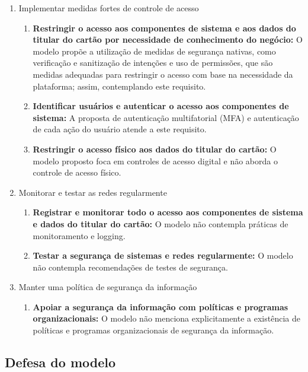\begin{enumerate}
        \item Implementar medidas fortes de controle de acesso
            \begin{enumerate}
            \item \textbf{Restringir o acesso aos componentes de sistema e aos dados do titular do cartão por necessidade de conhecimento do negócio:} O modelo propõe a utilização de medidas de segurança nativas, como verificação e sanitização de intenções e uso de permissões, que são medidas adequadas para restringir o acesso com base na necessidade da plataforma; assim, contemplando este requisito. 
            \item \textbf{Identificar usuários e autenticar o acesso aos componentes de sistema:} A proposta de autenticação multifatorial (MFA) e autenticação de cada ação do usuário atende a este requisito.
            \item \textbf{Restringir o acesso físico aos dados do titular do cartão:} O modelo proposto  foca em controles de acesso digital e não aborda o controle de acesso físico. 
            \end{enumerate}

        \item Monitorar e testar as redes regularmente
            \begin{enumerate}
            \item \textbf{Registrar e monitorar todo o acesso aos componentes de sistema e dados do titular do cartão:} O modelo não contempla práticas de monitoramento e logging.
            \item \textbf{Testar a segurança de sistemas e redes regularmente:} O modelo não contempla recomendações de testes de segurança.
            \end{enumerate}

        \item Manter uma política de segurança da informação
            \begin{enumerate}
            \item \textbf{Apoiar a segurança da informação com políticas e programas organizacionais:} O modelo não menciona explicitamente a existência de políticas e programas organizacionais de segurança da informação.
            \end{enumerate}
    \end{enumerate}


    \subsection{Defesa do modelo}
    
